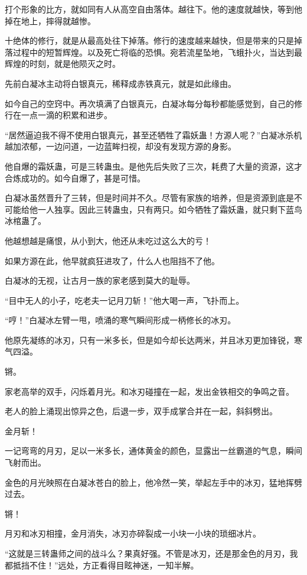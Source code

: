 \begin{this_body}
打个形象的比方，就如同有人从高空自由落体。越往下。他的速度就越快，等到他掉在地上，摔得就越惨。

十绝体的修行，就是从最高处往下掉落。修行的速度越来越快，但是带来的只是掉落过程中的短暂辉煌。以及死亡将临的恐惧。宛若流星坠地，飞蛾扑火，当达到最辉煌的时刻，就是他陨灭之时。

先前白凝冰主动将白银真元，稀释成赤铁真元，就是如此缘由。

如今自己的空窍中。再次填满了白银真元，白凝冰每分每秒都能感觉到，自己的修行在一点一滴的积累和进步。

“居然逼迫我不得不使用白银真元，甚至还牺牲了霜妖蛊！方源人呢？”白凝冰杀机越加浓郁，一边问道，一边蓝眸扫视，却没有发现方源的身影。

他自爆的霜妖蛊，可是三转蛊虫。是他先后失败了三次，耗费了大量的资源，这才合炼成功的。如今自爆了，甚是可惜。

白凝冰虽然晋升了三转，但是时间并不久。尽管有家族的培养，但是资源到底是不可能给他一人独享。因此三转蛊虫，只有两只。如今牺牲了霜妖蛊，就只剩下蓝鸟冰棺蛊了。

他越想越是痛恨，从小到大，他还从未吃过这么大的亏！

如果方源在此，他早就疯狂进攻了，什么人也阻挡不了他。

白凝冰的无视，让古月一族的家老感到莫大的耻辱。

“目中无人的小子，吃老夫一记月刀斩！”他大喝一声，飞扑而上。

“哼！”白凝冰左臂一甩，喷涌的寒气瞬间形成一柄修长的冰刃。

他原先凝练的冰刃，只有一米多长，但是如今却长达两米，并且冰刃更加锋锐，寒气四溢。

锵。

家老高举的双手，闪烁着月光。和冰刃碰撞在一起，发出金铁相交的争鸣之音。

老人的脸上涌现出惊异之色，后退一步，双手成掌合并在一起，斜斜劈出。

金月斩！

一记弯弯的月刃，足以一米多长，通体黄金的颜色，显露出一丝霸道的气息，瞬间飞射而出。

金色的月光映照在白凝冰苍白的脸上，他冷然一笑，举起左手中的冰刃，猛地挥劈过去。

锵！

月刃和冰刃相撞，金月消失，冰刃亦碎裂成一小块一小块的琐细冰片。

“这就是三转蛊师之间的战斗么？果真好强。不管是冰刃，还是那金色的月刃，我都抵挡不住！”远处，方正看得目眩神迷，一知半解。


\end{this_body}
